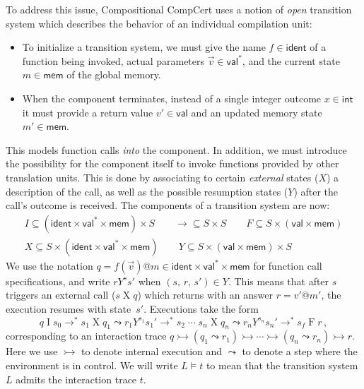 \documentclass[acmsmall,screen,review,anonymous]{acmart}
\newcommand{\kw}[1]{\ensuremath{ \mathsf{#1} }}
\begin{document}
To address this issue,
Compositional CompCert \cite{compcompcert}
uses a notion of \emph{open} transition system
which describes
the behavior of an individual compilation unit:
\begin{itemize}
\item
To initialize a transition system,
we must give the name $f \in \kw{ident}$
of a function being invoked,
actual parameters $\vec{v} \in \kw{val}^*$,
and the current state $m \in \kw{mem}$ of the global memory.
\item
When the component terminates,
instead of a single integer outcome $x \in \kw{int}$ it must provide
a return value $v' \in \kw{val}$ and an updated memory state $m' \in \kw{mem}$.
\end{itemize}
This models function calls \emph{into} the component.
In addition,
we must introduce the possibility for the component itself
to invoke functions
provided by other translation units.
This is done by associating to certain \emph{external} states ($X$)
a description of the call,
as well as the possible resumption states ($Y$)
after the call's outcome is received.
The components of a transition system are now:
\begin{equation}
 \begin{array}{c}
  I \subseteq (\kw{ident} \times \kw{val}^* \times \kw{mem}) \times S
  \qquad
  {\rightarrow} \subseteq S \times S
  \qquad
  F \subseteq S \times (\kw{val} \times \kw{mem})
  \\
  X \subseteq S \times (\kw{ident} \times \kw{val}^* \times \kw{mem})
  \qquad
  Y \subseteq S \times (\kw{val} \times \kw{mem}) \times S
 \end{array}
 \label{eqn:compcomp-lts}
\end{equation}
We use the notation $q = f(\vec{v})@m \in \kw{ident} \times \kw{val}^* \times \kw{mem}$
for function call specifications,
and write $r \mathrel{Y^s} s'$ when $(s, \, r, \, s') \in Y$.
This means that
after $s$ triggers an external call ($s \mathrel{X} q$)
which returns with an answer $r = v'@m'$,
the execution resumes with state~$s'$.
Executions take the form
\[
  q \mathrel{I} s_0 \rightarrow^*
  s_1 \mathrel{X} q_1 \leadsto
  r_1 \mathrel{Y^{s_1}} s_1' \rightarrow^*
  s_2 \mathrel{\cdots}
  s_n \mathrel{X} q_n \leadsto
  r_n \mathrel{Y^{s_n}} s_n' \rightarrow^*
  s_f \mathrel{F} r
  \,,
\]
corresponding to an interaction trace
$
  q \rightarrowtail
  (q_1 \leadsto r_1) \rightarrowtail
  \cdots \rightarrowtail
  (q_n \leadsto r_n) \rightarrowtail
  r
$.
Here we use $\rightarrowtail$ to denote internal execution
and $\leadsto$ to denote a step where the environment is in control.
We will write $L \vDash t$
to mean that the transition system $L$
admits the interaction trace $t$.
\end{document}
